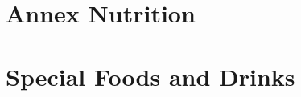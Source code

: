 \documentclass[../main.tex]{subfiles}
\begin{document}


\chapter{Annex Nutrition}




\chapter{Special Foods and Drinks}










\label{FoodSoy}
\end{document}
